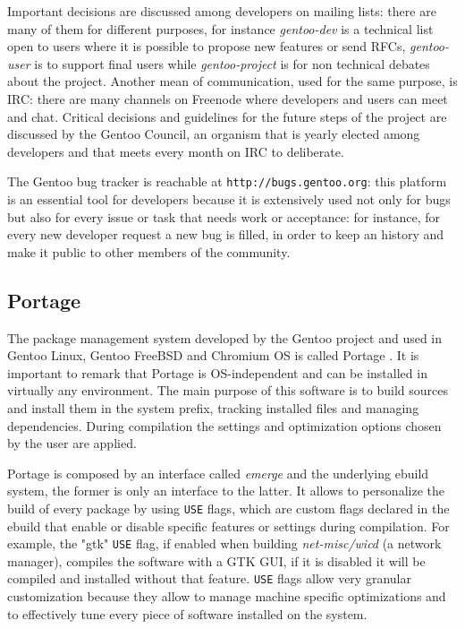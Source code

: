 Important decisions are discussed among developers on mailing lists: there are many of them for different purposes, for instance \emph{gentoo-dev} is a technical list open to users where it is possible to propose new features or send RFCs, \emph{gentoo-user} is to support final users while \emph{gentoo-project} is for non technical debates about the project. Another mean of communication, used for the same purpose, is IRC: there are many channels on Freenode \cite{gentoo_irc} where developers and users can meet and chat.
Critical decisions and guidelines for the future steps of the project are discussed by the Gentoo Council, an organism that is yearly elected among developers and that meets every month on IRC to deliberate.

The Gentoo bug tracker is reachable at \texttt{http://bugs.gentoo.org}: this platform is an essential tool for developers because it is extensively used not only for bugs but also for every issue or task that needs work or acceptance: for instance, for every new developer request a new bug is filled, in order to keep an history and make it public to other members of the community.


\subsection{Portage}
The package management system developed by the Gentoo project and used in Gentoo Linux, Gentoo FreeBSD and Chromium OS is called Portage \cite{gentoo_portage}. It is important to remark that Portage is OS-independent and can be installed in virtually any environment.
The main purpose of this software is to build sources and install them in the system prefix, tracking installed files and managing dependencies. During compilation the settings and optimization options chosen by the user are applied.

Portage is composed by an interface called \emph{emerge} and the underlying ebuild system, the former is only an interface to the latter. It allows to personalize the build of every package by using \texttt{USE} flags, which are custom flags declared in the ebuild that enable or disable specific features or settings during compilation. For example, the "gtk" \texttt{USE} flag, if enabled when building \emph{net-misc/wicd} (a network manager), compiles the software with a GTK GUI, if it is disabled it will be compiled and installed without that feature. \texttt{USE} flags allow very granular customization because they allow to manage machine specific optimizations and to effectively tune every piece of software installed on the system.

